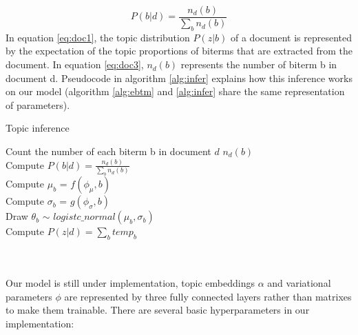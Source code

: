 \begin{equation}
    P(b|d) = \frac{n_d(b)}{\sum_bn_d(b)}
\label{eq:doc3}
\end{equation}
In equation \ref{eq:doc1}, the topic distribution $P(z|b)$ of a document is represented by the expectation of the topic proportions of biterms that are extracted from the document. In equation \ref{eq:doc3}, $n_d(b)$ represents the number of biterm b in document d. Pseudocode in algorithm \ref{alg:infer} explains how this inference works on our model (algorithm \ref{alg:ebtm} and \ref{alg:infer} share the same representation of parameters).
\begin{algorithm}[!htbp]
    \caption{Topic inference}
    \label{alg:infer}
    \LinesNumbered
    Count the number of each biterm b in document $d$ $n_d(b)$\\
    {
        Compute $P(b|d) = \frac{n_d(b)}{\sum_bn_d(b)}$\\
        Compute $\mu_b$ = $f(\phi_{\mu},b)$\\
        Compute $\sigma_b$ = $g(\phi_{\sigma},b)$\\ 
        Draw $\theta_b$ $\sim$ $logistc\_normal(\mu_b,\sigma_b)$\\
    }
    {
        Compute $P(z|d) = \sum_b temp_b$
    }
\end{algorithm}
\\\\Our model is still under implementation, topic embeddings $\alpha$ and variational parameters $\phi$ are represented by three fully connected layers rather than matrixes to make them trainable. There are several basic hyperparameters in our implementation:
